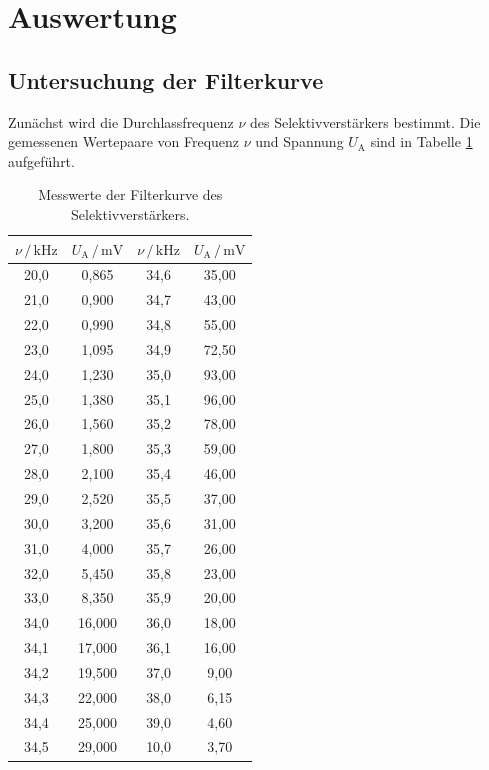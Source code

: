 \section{Auswertung}
\label{sec:Auswertung}

\subsection{Untersuchung der Filterkurve}

Zunächst wird die Durchlassfrequenz $\nu$ des Selektivverstärkers bestimmt. Die 
gemessenen Wertepaare von Frequenz $\nu$ und Spannung $U_\text{A}$ sind in 
Tabelle \ref{tab:Messdaten1} aufgeführt. 

\begin{table}
\centering
\caption{Messwerte der Filterkurve des Selektivverstärkers.}
\label{tab:Messdaten1}
\begin{tabular}{c c c c}
\toprule
$\nu \,/\, \si{\kilo\hertz}$ & $U_\text{A} \,/\, \si{\milli\volt}$ & $\nu \,/\, \si{\kilo\hertz}$ & $U_\text{A} \,/\, \si{\milli\volt}$\\
\midrule
20,0 &  0,865 & 34,6 & 35,00\\
21,0 &  0,900 & 34,7 & 43,00\\
22,0 &  0,990 & 34,8 & 55,00\\
23,0 &  1,095 & 34,9 & 72,50\\
24,0 &  1,230 & 35,0 & 93,00\\
25,0 &  1,380 & 35,1 & 96,00\\
26,0 &  1,560 & 35,2 & 78,00\\
27,0 &  1,800 & 35,3 & 59,00\\
28,0 &  2,100 & 35,4 & 46,00\\
29,0 &  2,520 & 35,5 & 37,00\\
30,0 &  3,200 & 35,6 & 31,00\\
31,0 &  4,000 & 35,7 & 26,00\\
32,0 &  5,450 & 35,8 & 23,00\\
33,0 &  8,350 & 35,9 & 20,00\\
34,0 & 16,000 & 36,0 & 18,00\\
34,1 & 17,000 & 36,1 & 16,00\\
34,2 & 19,500 & 37,0 &  9,00\\
34,3 & 22,000 & 38,0 &  6,15\\
34,4 & 25,000 & 39,0 &  4,60\\
34,5 & 29,000 & 10,0 &  3,70\\
\bottomrule
\end{tabular}
\end{table}

